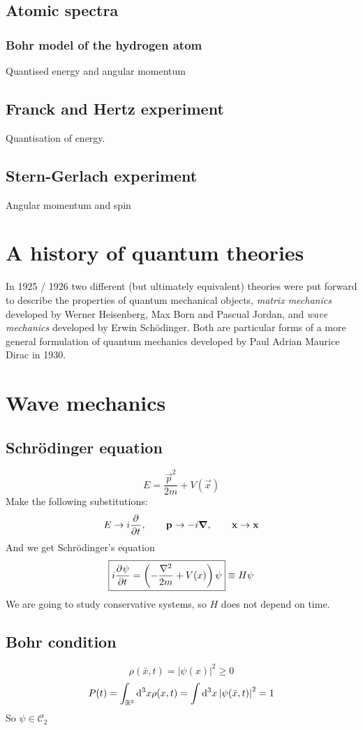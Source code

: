 \subsection{Atomic spectra}
\subsubsection{Bohr model of the hydrogen atom}
Quantised energy and angular momentum

\subsection{Franck and Hertz experiment}
Quantisation of energy.

\subsection{Stern-Gerlach experiment}
Angular momentum and spin

\section{A history of quantum theories}


In 1925 / 1926 two different (but ultimately equivalent) theories were put forward to describe the properties of quantum mechanical objects, \textit{matrix mechanics} developed by Werner Heisenberg, Max Born and Pascual Jordan, and \textit{wave mechanics} developed by Erwin Sch\"odinger. Both are particular forms of a more general formulation of quantum mechanics developed by Paul Adrian Maurice Dirac in 1930.


\section{Wave mechanics}
\subsection{Schr\"odinger equation}
\[ E= \frac{\vec{p}^2}{2m}+V(\vec{x}) \]
Make the following substitutions:
\[ E \to i  \frac{\partial{^{}}}{\partial{{t}^{}}} , \qquad \boldsymbol{\mathrm{p}} \to -i \boldsymbol{\mathrm{\nabla}}, \qquad \boldsymbol{\mathrm{x}} \to \boldsymbol{\mathrm{x}} \]
And we get Schrödinger's equation
\[ \boxed{i  \frac{\partial{^{}}\psi}{\partial{{t}^{}}}  = \left(- \frac{\nabla^2}{2m}+V(x)\right)\psi} \equiv H\psi \]
We are going to study conservative systems, so $H$ does not depend on time.
\subsection{Bohr condition}
\[\rho(\bar{x},t) = \left|\psi(x)\right|^2 \geq 0 \]
\[ P(t) = \int_{\mathbb{R}^3} \operatorname{d \!}{^3x}\rho(x,t) = \int \operatorname{d \!}{^3x}\left|\psi(\bar{x},t)\right|^2 = 1 \]
So $\psi \in \mathcal{C}_2$
